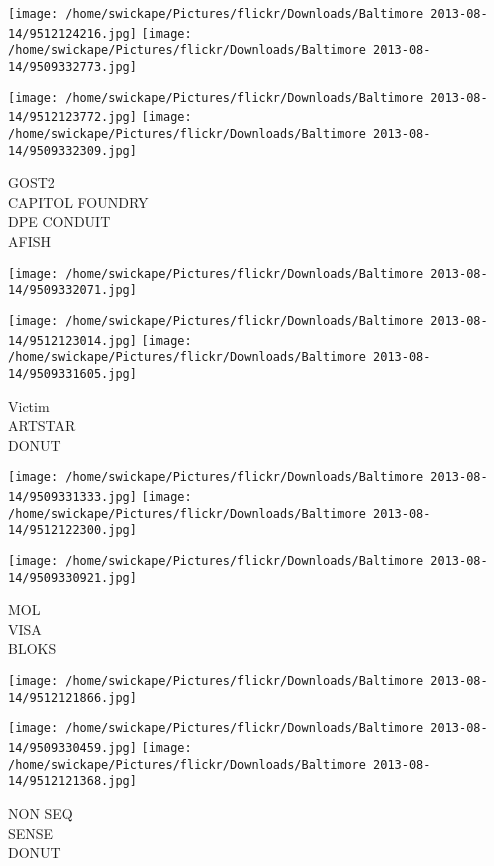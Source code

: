 \documentclass[10pt,letterpaper]{article}
\begin{document}
\texttt{[image: /home/swickape/Pictures/flickr/Downloads/Baltimore 2013-08-14/9512124216.jpg]}
\texttt{[image: /home/swickape/Pictures/flickr/Downloads/Baltimore 2013-08-14/9509332773.jpg]}

\texttt{[image: /home/swickape/Pictures/flickr/Downloads/Baltimore 2013-08-14/9512123772.jpg]}
\texttt{[image: /home/swickape/Pictures/flickr/Downloads/Baltimore 2013-08-14/9509332309.jpg]}

GOST2\\
CAPITOL FOUNDRY\\
DPE CONDUIT\\
AFISH\\
\pagebreak

\texttt{[image: /home/swickape/Pictures/flickr/Downloads/Baltimore 2013-08-14/9509332071.jpg]}

\vspace{0.25in}
\texttt{[image: /home/swickape/Pictures/flickr/Downloads/Baltimore 2013-08-14/9512123014.jpg]}
\texttt{[image: /home/swickape/Pictures/flickr/Downloads/Baltimore 2013-08-14/9509331605.jpg]}

Victim\\
ARTSTAR\\
DONUT\\
\pagebreak

\texttt{[image: /home/swickape/Pictures/flickr/Downloads/Baltimore 2013-08-14/9509331333.jpg]}
\texttt{[image: /home/swickape/Pictures/flickr/Downloads/Baltimore 2013-08-14/9512122300.jpg]}

\texttt{[image: /home/swickape/Pictures/flickr/Downloads/Baltimore 2013-08-14/9509330921.jpg]}

MOL\\
VISA\\
BLOKS\\
\pagebreak

\texttt{[image: /home/swickape/Pictures/flickr/Downloads/Baltimore 2013-08-14/9512121866.jpg]}

\vspace{0.25in}
\texttt{[image: /home/swickape/Pictures/flickr/Downloads/Baltimore 2013-08-14/9509330459.jpg]}
\texttt{[image: /home/swickape/Pictures/flickr/Downloads/Baltimore 2013-08-14/9512121368.jpg]}

NON SEQ\\
SENSE\\
DONUT\\
\pagebreak
\end{document}
